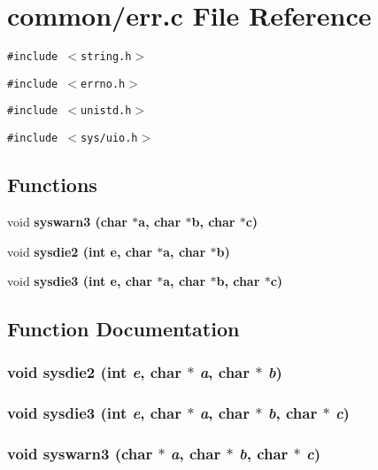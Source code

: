 \section{common/err.c File Reference}
\label{err_8c}
{\tt \#include $<$string.h$>$}\par
{\tt \#include $<$errno.h$>$}\par
{\tt \#include $<$unistd.h$>$}\par
{\tt \#include $<$sys/uio.h$>$}\par
\subsection*{Functions}
\begin{CompactItemize}
\item 
void \bf{syswarn3} (char $\ast$a, char $\ast$b, char $\ast$c)
\item 
void \bf{sysdie2} (int e, char $\ast$a, char $\ast$b)
\item 
void \bf{sysdie3} (int e, char $\ast$a, char $\ast$b, char $\ast$c)
\end{CompactItemize}


\subsection{Function Documentation}
\subsubsection{\setlength{\rightskip}{0pt plus 5cm}void sysdie2 (int {\em e}, char $\ast$ {\em a}, char $\ast$ {\em b})}\label{err_8c_e4fadbd787389945bb289d3677e2c4ee}


\subsubsection{\setlength{\rightskip}{0pt plus 5cm}void sysdie3 (int {\em e}, char $\ast$ {\em a}, char $\ast$ {\em b}, char $\ast$ {\em c})}\label{err_8c_ff3097f06ccebc20b574ab49be373711}


\subsubsection{\setlength{\rightskip}{0pt plus 5cm}void syswarn3 (char $\ast$ {\em a}, char $\ast$ {\em b}, char $\ast$ {\em c})}\label{err_8c_2d166e6433c0630cbb4955c56527f2bc}



